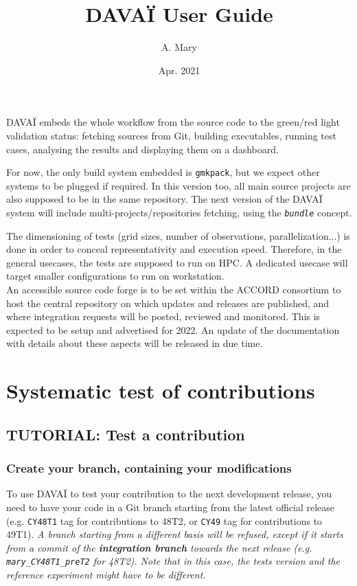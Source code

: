 \documentclass[a4paper,10pt,twoside]{article}
\title{DAVAÏ User Guide}
\author{A. Mary}
\date{Apr. 2021}
\begin{document}
\maketitle

\tableofcontents
\vspace{1cm}
\newpage


DAVAÏ embeds the whole workflow from the source code to the green/red light validation status: fetching sources from Git, building executables, running test cases, analysing the results and displaying them on a dashboard.

For now, the only build system embedded is \texttt{gmkpack}, but we expect other systems to be plugged if required. In this version too, all main source projects are also supposed to be in the same repository. The next version of the DAVAÏ system will include multi-projects/repositories fetching, using the \textit{\texttt{bundle}} concept.

The dimensioning of tests (grid sizes, number of observations, parallelization...) is done in order to conceal representativity and execution speed. Therefore, in the general usecases, the tests are supposed to run on HPC. A dedicated usecase will target smaller configurations to run on workstation.\\

An accessible source code forge is to be set within the ACCORD consortium to host the central repository on which updates and releases are published, and where integration requests will be posted, reviewed and monitored. This is expected to be setup and advertised for 2022.
An update of the documentation with details about these aspects will be released in due time.



\newpage
\section{Systematic test of contributions}

\subsection{TUTORIAL: Test a contribution} 
\subsubsection{Create your branch, containing your modifications}
To use DAVAÏ to test your contribution to the next development release, you need to have your code in a Git branch starting from the latest official release (e.g. \texttt{CY48T1} tag for contributions to 48T2, or \texttt{CY49} tag for contributions to 49T1). \textit{A branch starting from a different basis will be refused, except if it starts from a commit of the \textbf{integration branch} towards the next release (e.g. \texttt{\textit{mary\_CY48T1\_preT2}} for 48T2). Note that in this case, the tests version and the reference experiment might have to be different.}\\
\end{document}
